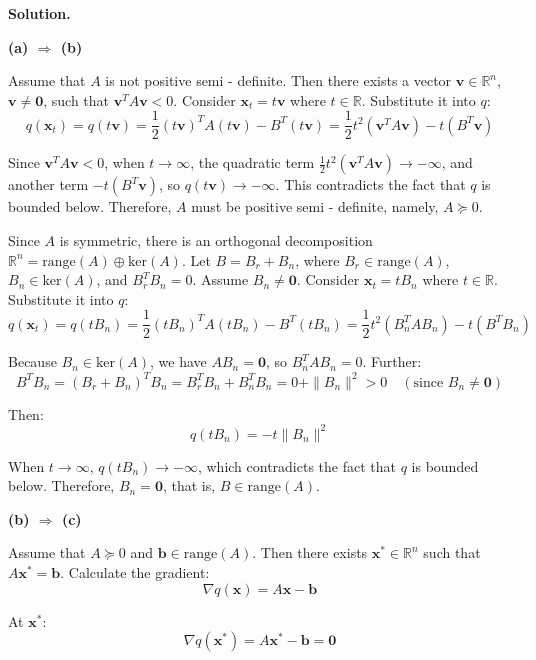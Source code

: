 \documentclass[12pt, a4paper, oneside]{ctexart}
\newenvironment{solution}{\par\noindent\textbf{Solution. }}{\par}
\begin{document}
\begin{solution}

\vspace{12pt}

\textbf{(a) $\Rightarrow$ (b)}

Assume that $ A $ is not positive semi - definite. Then there exists a vector $ \mathbf{v} \in \mathbb{R}^n $, $ \mathbf{v} \neq \mathbf{0} $, such that $ \mathbf{v}^TA\mathbf{v}< 0 $. Consider $ \mathbf{x}_t = t\mathbf{v} $ where $ t \in \mathbb{R} $. Substitute it into $ q $:
$$
q(\mathbf{x}_t)=q(t\mathbf{v})=\frac{1}{2}(t\mathbf{v})^TA(t\mathbf{v})-B^T(t\mathbf{v})=\frac{1}{2}t^2(\mathbf{v}^TA\mathbf{v})-t(B^T\mathbf{v})
$$

Since $ \mathbf{v}^TA\mathbf{v}< 0 $, when $ t \to \infty $, the quadratic term $ \frac{1}{2}t^2(\mathbf{v}^TA\mathbf{v})\to -\infty $, and another term $ -t(B^T\mathbf{v}) $, so $ q(t\mathbf{v})\to -\infty $. This contradicts the fact that $q$ is bounded below. Therefore, $ A $ must be positive semi - definite, namely, $ A \succeq 0 $.

Since $ A $ is symmetric, there is an orthogonal decomposition $ \mathbb{R}^n=\text{range}(A)\oplus \text{ker}(A) $. Let $ B=B_r+B_n $, where $ B_r \in \text{range}(A) $, $ B_n \in \text{ker}(A) $, and $ B_r^TB_n = 0 $. Assume $ B_n\neq \mathbf{0} $. Consider $ \mathbf{x}_t = tB_n $ where $ t \in \mathbb{R} $. Substitute it into $q $:
$$
q(\mathbf{x}_t)=q(tB_n)=\frac{1}{2}(tB_n)^TA(tB_n)-B^T(tB_n)=\frac{1}{2}t^2(B_n^TAB_n)-t(B^TB_n)
$$

Because $ B_n \in \text{ker}(A) $, we have $ AB_n=\mathbf{0} $, so $ B_n^TAB_n = 0 $. Further:
$$
B^TB_n=(B_r + B_n)^TB_n=B_r^TB_n+B_n^TB_n = 0+\|B_n\|^2>0\quad (\text{since } B_n\neq \mathbf{0})
$$

Then:
$$
q(tB_n)=-t\|B_n\|^2
$$

When $ t \to \infty $, $ q(tB_n)\to -\infty $, which contradicts the fact that $ q $ is bounded below. Therefore, $ B_n=\mathbf{0} $, that is, $ B \in \text{range}(A)$.

\vspace{12pt}

\textbf{(b) $\Rightarrow$ (c)}

Assume that $ A \succeq 0 $ and $ \mathbf{b} \in \text{range}(A) $. Then there exists $ \mathbf{x}^* \in \mathbb{R}^n $ such that $ A\mathbf{x}^* = \mathbf{b} $. Calculate the gradient:
$$
\nabla q(\mathbf{x}) = A\mathbf{x} - \mathbf{b}
$$

At $ \mathbf{x}^* $:
$$
\nabla q(\mathbf{x}^*) = A\mathbf{x}^* - \mathbf{b} = \mathbf{0}
$$


\end{solution}
\end{document}

